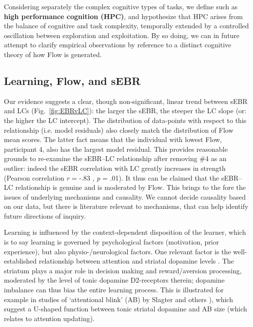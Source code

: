 \documentclass[fleqn,10pt]{wlscirep}
\begin{document}
Considering separately the complex cognitive types of tasks, we define such as {\bf high performance cognition (HPC)}, and hypothesize that HPC arises from the balance of cognitive and task complexity, temporally extended by a controlled oscillation between exploration and exploitation. By so doing, we can in future attempt to clarify empirical observations by reference to a distinct cognitive theory of how Flow is generated.


\subsection*{Learning, Flow, and sEBR}
Our evidence suggests a clear, though non-significant, linear trend between sEBR and LCs (Fig.~\ref{fig:EBRvLC}): the larger the sEBR, the steeper the LC slope (or: the higher the LC intercept). The distribution of data-points with respect to this relationship (i.e. model residuals) also closely match the distribution of Flow mean scores. The latter fact means that the individual with lowest Flow, participant 4, also has the largest model residual. This provides reasonable grounds to re-examine the sEBR--LC relationship after removing \#4 as an outlier: indeed the sEBR correlation with LC greatly increases in strength (Pearson correlation {\it r} = -.83 , {\it p} = .01). It thus can be claimed that the sEBR--LC relationship is genuine and is moderated by Flow. This brings to the fore the issues of underlying mechanisms and causality. We cannot decide causality based on our data, but there is literature relevant to mechanisms, that can help identify future directions of inquiry.

Learning is influenced by the context-dependent disposition of the learner, which is to say learning is governed by psychological factors (motivation, prior experience), but also physio-/neurological factors. One relevant factor is the well-established relationship between attention and striatal dopamine levels \cite{Dreisbach2005}. The striatum plays a major role in decision making and reward/aversion processing, moderated by the level of tonic dopamine D2-receptors therein; dopamine imbalance can thus bias the entire learning process. This is illustrated for example in studies of `attentional blink' (AB) by Slagter and others \cite{Slagter2012,COLZATO2008}), which suggest a U-shaped function between tonic striatal dopamine and AB size (which relates to attention updating).
\end{document}
